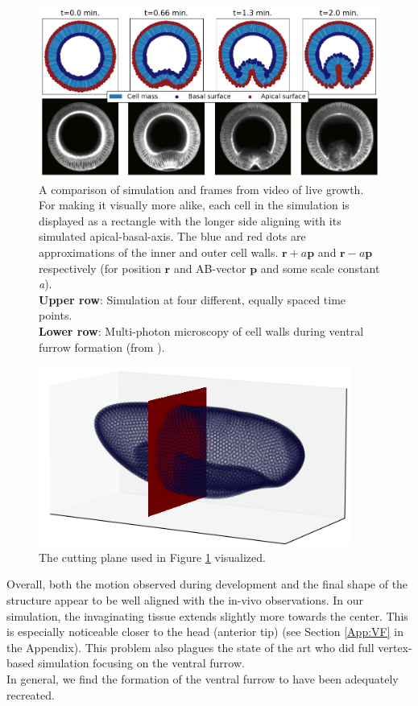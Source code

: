\begin{figure}[H]
    \centering
    \includegraphics[width=1\linewidth]{chapters/Results/figures/VF_comparison.png}
    \caption{A comparison of simulation and frames from video of live growth. For making it visually more alike, each cell in the simulation is displayed as a rectangle with the longer side aligning with its simulated apical-basal-axis. The blue and red dots are approximations of the inner and outer cell walls. $\textbf{r} + a\textbf{p}$ and $\textbf{r}-a\textbf{p}$ respectively (for position $\textbf{r}$ and AB-vector $\textbf{p}$ and some scale constant \textit{a}).  \\\textbf{Upper row}: Simulation at four different, equally spaced time points. \\\textbf{Lower row}: Multi-photon microscopy of cell walls during ventral furrow formation (from ). \\}
    \label{fig:VFComparison}
\end{figure}

\begin{figure}[h]
    \centering
    \includegraphics[width=0.5\linewidth]{chapters/Results/figures/planecut2.png}
    \caption{The cutting plane used in Figure \ref{fig:VFComparison} visualized.}
\end{figure}
Overall, both the motion observed during development and the final shape of the structure appear to be well aligned with the in-vivo observations.
In our simulation, the invaginating tissue extends slightly more towards the center. This is especially noticeable closer to the head (anterior tip) (see Section \ref{App:VF} in the Appendix). This problem also plagues the state of the art  who did full vertex-based simulation focusing on the ventral furrow.\\
In general, we find the formation of the ventral furrow to have been adequately recreated. 


